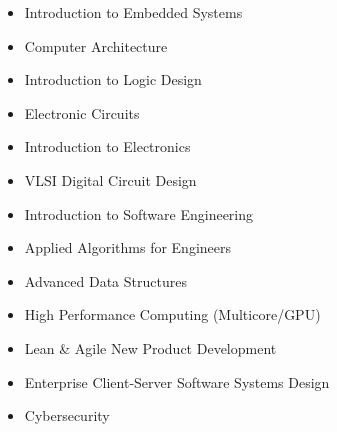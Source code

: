 \documentclass{tccv_AH}
\begin{document}
\begin{itemize}
    \itemsep-0.2em

    \item{Introduction to Embedded Systems}
    \item{Computer Architecture}
    \item{Introduction to Logic Design}
    \item{Electronic Circuits}
    \item{Introduction to Electronics}
    \item{VLSI Digital Circuit Design}
    \item{Introduction to Software Engineering}
    \item{Applied Algorithms for Engineers}
    \item{Advanced Data Structures}
    \item{High Performance Computing (Multicore/GPU)}
    \item{Lean \& Agile New Product Development}
    \item{Enterprise Client-Server Software Systems Design}
    \item{Cybersecurity}

\end{itemize}
\end{document}
